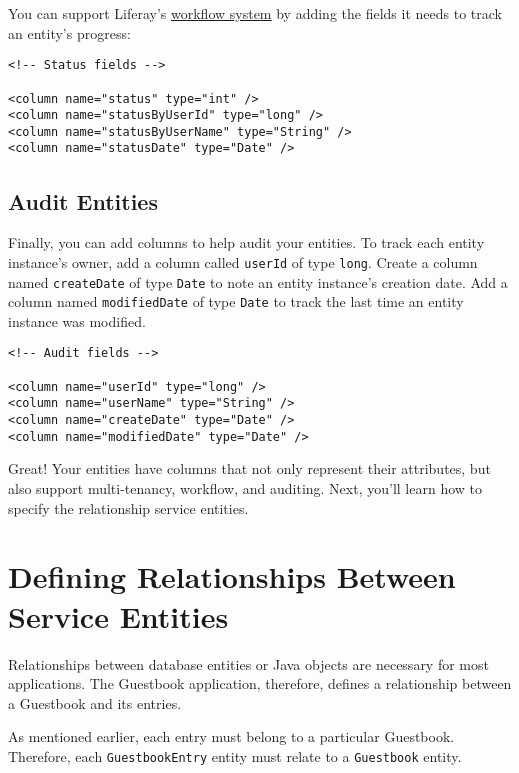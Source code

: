You can support Liferay's
\href{/docs/7-2/user/-/knowledge_base/u/workflow}{workflow system} by
adding the fields it needs to track an entity's progress:

\begin{verbatim}
<!-- Status fields -->

<column name="status" type="int" />
<column name="statusByUserId" type="long" />
<column name="statusByUserName" type="String" />
<column name="statusDate" type="Date" />
\end{verbatim}

\section{Audit Entities}\label{audit-entities}

Finally, you can add columns to help audit your entities. To track each
entity instance's owner, add a column called \texttt{userId} of type
\texttt{long}. Create a column named \texttt{createDate} of type
\texttt{Date} to note an entity instance's creation date. Add a column
named \texttt{modifiedDate} of type \texttt{Date} to track the last time
an entity instance was modified.

\begin{verbatim}
<!-- Audit fields -->

<column name="userId" type="long" />
<column name="userName" type="String" />
<column name="createDate" type="Date" />
<column name="modifiedDate" type="Date" />
\end{verbatim}

Great! Your entities have columns that not only represent their
attributes, but also support multi-tenancy, workflow, and auditing.
Next, you'll learn how to specify the relationship service entities.

\chapter{Defining Relationships Between Service
Entities}\label{defining-relationships-between-service-entities}

Relationships between database entities or Java objects are necessary
for most applications. The Guestbook application, therefore, defines a
relationship between a Guestbook and its entries.

As mentioned earlier, each entry must belong to a particular Guestbook.
Therefore, each \texttt{GuestbookEntry} entity must relate to a
\texttt{Guestbook} entity.

